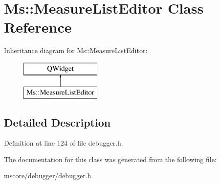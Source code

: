 \hypertarget{class_ms_1_1_measure_list_editor}{}\section{Ms\+:\+:Measure\+List\+Editor Class Reference}
\label{class_ms_1_1_measure_list_editor}
Inheritance diagram for Ms\+:\+:Measure\+List\+Editor\+:\begin{figure}[H]
\begin{center}
\leavevmode
\includegraphics[height=2.000000cm]{class_ms_1_1_measure_list_editor}
\end{center}
\end{figure}


\subsection{Detailed Description}


Definition at line 124 of file debugger.\+h.



The documentation for this class was generated from the following file\+:\begin{DoxyCompactItemize}
\item 
mscore/debugger/debugger.\+h\end{DoxyCompactItemize}
